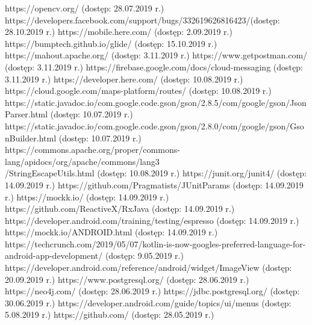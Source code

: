 \documentclass[10pt,twoside,a4paper]{report}
\begin{document}
\begin{thebibliography}{1}
   https://opencv.org/ (dostęp: 28.07.2019 r.)
   https://developers.facebook.com/support/bugs/332619626816423/(dostęp: 28.10.2019 r.)
   https://mobile.here.com/ (dostęp: 2.09.2019 r.)
   https://bumptech.github.io/glide/ (dostęp: 15.10.2019 r.)
   https://mahout.apache.org/ (dostęp: 3.11.2019 r.)
   https://www.getpostman.com/ (dostęp: 3.11.2019 r.)
   https://firebase.google.com/docs/cloud-messaging (dostęp: 3.11.2019 r.)
   https://developer.here.com/ (dostęp: 10.08.2019 r.)
   https://cloud.google.com/maps-platform/routes/ (dostęp: 10.08.2019 r.)
   https://static.javadoc.io/com.google.code.gson/gson/2.8.5/com/google/gson/JsonParser.html (dostęp: 10.07.2019 r.)
   https://static.javadoc.io/com.google.code.gson/gson/2.8.0/com/google/gson/GsonBuilder.html (dostęp: 10.07.2019 r.)
   https://commons.apache.org/proper/commons-lang/apidocs/org/apache/commons/lang3\\/StringEscapeUtils.html (dostęp: 10.08.2019 r.)
   https://junit.org/junit4/ (dostęp: 14.09.2019 r.)
   https://github.com/Pragmatists/JUnitParams (dostęp: 14.09.2019 r.)
   https://mockk.io/ (dostęp: 14.09.2019 r.)
   https://github.com/ReactiveX/RxJava (dostęp: 14.09.2019 r.) 
   https://developer.android.com/training/testing/espresso (dostęp: 14.09.2019 r.)
   https://mockk.io/ANDROID.html (dostęp: 14.09.2019 r.)
   https://techcrunch.com/2019/05/07/kotlin-is-now-googles-preferred-language-for-android-app-development/ (dostęp: 9.05.2019 r.)
   https://developer.android.com/reference/android/widget/ImageView (dostęp: 20.09.2019 r.)
   https://www.postgresql.org/ (dostęp: 28.06.2019 r.)
   https://neo4j.com/ (dostęp: 28.06.2019 r.)
   https://jdbc.postgresql.org/ (dostęp: 30.06.2019 r.)
   https://developer.android.com/guide/topics/ui/menus (dostęp: 5.08.2019 r.)
   https://github.com/ (dostęp: 28.05.2019 r.)
\end{thebibliography}


\listoffigures
\listoftables
\end{document}
